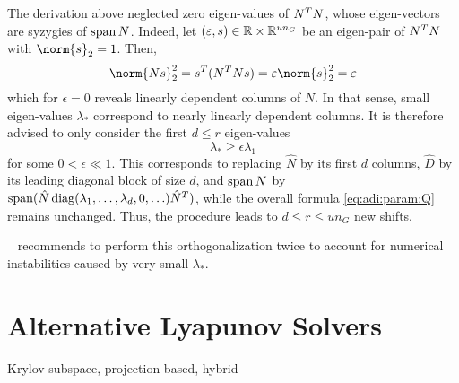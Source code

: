 The derivation above neglected zero eigen-values of $N^T N$,
whose eigen-vectors are syzygies of $\operatorname{span} N$.
Indeed, let $(\varepsilon,s)\in\mathbb{R}\times\mathbb{R}^{un_G}$ be an eigen-pair of $N^T N$ with $\norm{s}_2 = 1$.
Then,
\begin{equation*}
  \norm{Ns}_2^2
  = s^\T (N^\T N s)
  = \epsilon\norm{s}_2^2
  = \epsilon
\end{equation*}
which for $\epsilon=0$ reveals linearly dependent columns of $N$.
In that sense, small eigen-values $\lambda_*$ correspond to nearly linearly dependent columns.
It is therefore advised to only consider the first $d \leq r$ eigen-values
\begin{equation}
  \lambda_* \geq \epsilon \lambda_1
\end{equation}
for some $0 < \epsilon \ll 1$.
This corresponds to replacing
$\hat N$ by its first $d$ columns,
$\hat D$ by its leading diagonal block of size $d$,
and $\operatorname{span} N$ by $\operatorname{span}(\hat N \operatorname{diag}(\lambda_1, \ldots, \lambda_d, 0, \ldots) \hat N^T)$,
while the overall formula \eqref{eq:adi:param:Q} remains unchanged.
Thus, the procedure leads to $d \leq r \leq un_G$ new shifts.

\citeauthor{Kuerschner2016}~\cite{Kuerschner2016} recommends to perform this orthogonalization twice
to account for numerical instabilities caused by very small $\lambda_*$.



\section{Alternative Lyapunov Solvers}
Krylov subspace,
projection-based,
hybrid
